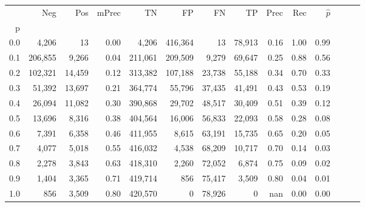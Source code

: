 \begin{tabular}{rrrrrrrrrrrrrr}
\toprule
{} &      Neg &     Pos & mPrec &       TN &       FP &      FN &      TP &  Prec &   Rec & $\hat{p}$ \\
p   &          &         &       &          &          &         &         &       &       &           \\
\midrule
0.0 &    4,206 &      13 &  0.00 &    4,206 &  416,364 &      13 &  78,913 &  0.16 &  1.00 &      0.99 \\
0.1 &  206,855 &   9,266 &  0.04 &  211,061 &  209,509 &   9,279 &  69,647 &  0.25 &  0.88 &      0.56 \\
0.2 &  102,321 &  14,459 &  0.12 &  313,382 &  107,188 &  23,738 &  55,188 &  0.34 &  0.70 &      0.33 \\
0.3 &   51,392 &  13,697 &  0.21 &  364,774 &   55,796 &  37,435 &  41,491 &  0.43 &  0.53 &      0.19 \\
0.4 &   26,094 &  11,082 &  0.30 &  390,868 &   29,702 &  48,517 &  30,409 &  0.51 &  0.39 &      0.12 \\
0.5 &   13,696 &   8,316 &  0.38 &  404,564 &   16,006 &  56,833 &  22,093 &  0.58 &  0.28 &      0.08 \\
0.6 &    7,391 &   6,358 &  0.46 &  411,955 &    8,615 &  63,191 &  15,735 &  0.65 &  0.20 &      0.05 \\
0.7 &    4,077 &   5,018 &  0.55 &  416,032 &    4,538 &  68,209 &  10,717 &  0.70 &  0.14 &      0.03 \\
0.8 &    2,278 &   3,843 &  0.63 &  418,310 &    2,260 &  72,052 &   6,874 &  0.75 &  0.09 &      0.02 \\
0.9 &    1,404 &   3,365 &  0.71 &  419,714 &      856 &  75,417 &   3,509 &  0.80 &  0.04 &      0.01 \\
1.0 &      856 &   3,509 &  0.80 &  420,570 &        0 &  78,926 &       0 &   nan &  0.00 &      0.00 \\
\bottomrule
\end{tabular}
